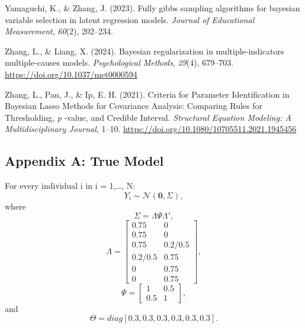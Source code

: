 \documentclass[
  man, donotrepeattitle,floatsintext]{apa6}
\newlength{\cslhangindent}
\newenvironment{CSLReferences}[2] %
 {\begin{list}{}{%
  \setlength{\itemindent}{0pt}
  \setlength{\leftmargin}{0pt}
  \setlength{\parsep}{0pt}
  \ifodd #1
   \setlength{\leftmargin}{\cslhangindent}
   \setlength{\itemindent}{-1\cslhangindent}
  \fi
  \setlength{\itemsep}{#2\baselineskip}}}
 {\end{list}}
\begin{document}
\begin{CSLReferences}{1}{0}
Yamaguchi, K., \& Zhang, J. (2023). Fully gibbs sampling algorithms for bayesian variable selection in latent regression models. \emph{Journal of Educational Measurement}, \emph{60}(2), 202--234.

Zhang, L., \& Liang, X. (2024). Bayesian regularization in multiple-indicators multiple-causes models. \emph{Psychological Methods}, \emph{29}(4), 679--703. \url{https://doi.org/10.1037/met0000594}

Zhang, L., Pan, J., \& Ip, E. H. (2021). Criteria for {Parameter} {Identification} in {Bayesian} {Lasso} {Methods} for {Covariance} {Analysis}: {Comparing} {Rules} for {Thresholding}, \emph{p} -value, and {Credible} {Interval}. \emph{Structural Equation Modeling: A Multidisciplinary Journal}, 1--10. \url{https://doi.org/10.1080/10705511.2021.1945456}

\end{CSLReferences}

\endgroup

\newpage

\appendix


\subsection{Appendix A: True Model}\label{appendix-a-true-model}

For every individual i in i = 1,\ldots, N:
\[Y_i \sim \mathcal{N}(\mathbf{0}, \Sigma),\] where
\[\Sigma = \Lambda\Psi\Lambda',\]
\[\Lambda = 
    \begin{bmatrix}
    0.75 & 0 \\
    0.75 & 0 \\
    0.75 & 0.2/0.5 \\
    0.2/0.5 & 0.75 \\
    0 & 0.75 \\
    0 & 0.75
    \end{bmatrix},\]
\[\Psi =
    \begin{bmatrix}
     1 & 0.5 \\
     0.5 & 1
    \end{bmatrix}
,\] and
\[\Theta = diag[0.3, 0.3, 0.3, 0.3, 0.3, 0.3].\]
\end{document}
